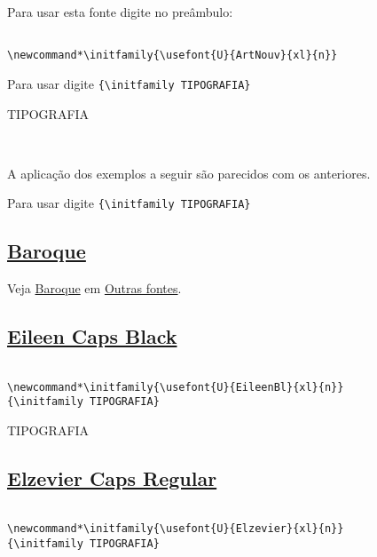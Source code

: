 \documentclass[a4paper]{article}
\newcommand{\tipo}{TIPOGRAFIA}
\begin{document}
Para usar esta fonte digite no preâmbulo:


\renewcommand*\initfamily{\usefont{U}{ArtNouv}{xl}{n}}

\begin{verbatim}

\newcommand*\initfamily{\usefont{U}{ArtNouv}{xl}{n}}
\end{verbatim}

Para usar digite \verb|{\initfamily TIPOGRAFIA}|

{\initfamily\Huge \tipo}

\

A aplicação dos exemplos a seguir são parecidos com os anteriores.

Para usar digite \verb|{\initfamily TIPOGRAFIA}|

\subsection*{\href{http://www.tug.dk/FontCatalogue/baroqueinitials/}{Baroque}}

Veja \href{http://www.tug.dk/FontCatalogue/baroqueinitials/}{Baroque} em \href{}{Outras fontes}.


\subsection*{\href{http://www.tug.dk/FontCatalogue/eileenbl/}{Eileen Caps Black}}


\renewcommand*\initfamily{\usefont{U}{EileenBl}{xl}{n}}

\begin{verbatim}

\newcommand*\initfamily{}
{\initfamily TIPOGRAFIA}
\end{verbatim}

{\initfamily\Huge \tipo}


\subsection*{\href{http://www.tug.dk/FontCatalogue/elzevier/}{Elzevier Caps Regular}}


\renewcommand*\initfamily{\usefont{U}{Elzevier}{xl}{n}}

\begin{verbatim}

\newcommand*\initfamily{\usefont{U}{Elzevier}{xl}{n}}
{\initfamily TIPOGRAFIA}
\end{verbatim}
\end{document}

